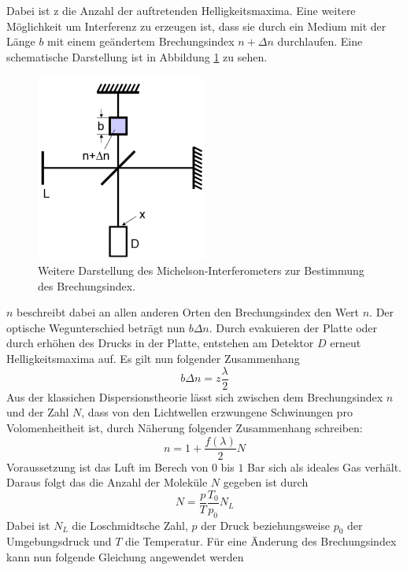 Dabei ist z die Anzahl der auftretenden Helligkeitsmaxima.
Eine weitere Möglichkeit um Interferenz zu erzeugen ist, dass sie durch ein Medium mit der Länge $b$ mit
einem geändertem Brechungsindex $n+\Delta n$ durchlaufen.
Eine schematische Darstellung ist in Abbildung \ref{abb:2} zu sehen.
\begin{figure}[H]
  \includegraphics[width=0.5\textwidth]{content/Aufbau2.png}
  \caption{Weitere Darstellung des Michelson-Interferometers zur Bestimmung des Brechungsindex.\cite{1}}
  \label{abb:2}
\end{figure}
$n$ beschreibt dabei an allen anderen Orten den Brechungsindex den Wert $n$. Der optische
Wegunterschied beträgt nun $b\Delta n$.
Durch evakuieren der Platte oder durch erhöhen des Drucks in der Platte, entstehen am Detektor $D$ erneut
Helligkeitsmaxima auf. Es gilt nun folgender Zusammenhang
\begin{equation}
  b\Delta n = z \frac{\lambda}{2}
  \label{eq:2}
\end{equation}
Aus der klassichen Dispersionstheorie lässt sich zwischen dem Brechungsindex $n$ und
der Zahl $N$, dass von den Lichtwellen erzwungene Schwinungen pro Volomenheitheit ist, durch Näherung folgender
Zusammenhang schreiben:
\begin{equation*}
  n = 1+\frac{f(\lambda)}{2}N
\end{equation*}
Voraussetzung ist das Luft im Berech von $0$ bis $1$ Bar sich als ideales Gas verhält.
Daraus folgt das die Anzahl der Moleküle $N$ gegeben ist durch
\begin{equation*}
  N = \frac{p}{T} \frac{T_0}{p_0} N_L
\end{equation*}
Dabei ist $N_L$ die Loschmidtsche Zahl, $p$ der Druck beziehungsweise $p_0$ der Umgebungsdruck und
$T$ die Temperatur.
Für eine Änderung des Brechungsindex kann nun folgende Gleichung angewendet werden

